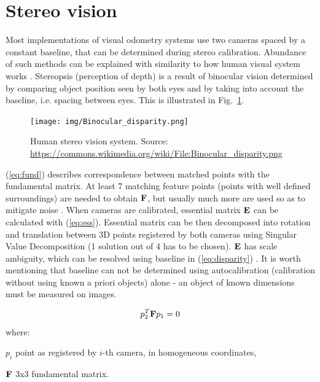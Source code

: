 
\section{Stereo vision}
\label{sec:stereo}

Most implementations of visual odometry systems use two cameras spaced by a constant baseline, that can be determined during stereo calibration. Abundance of such methods can be explained with similarity to how human visual system works \cite{cyganek}. Stereopsis (perception of depth) is a result of binocular vision determined by comparing object position seen by both eyes and by taking into account the baseline, i.e. spacing between eyes. This is illustrated in Fig.~\ref{fig:stereo}.

\begin{figure}[ht]
	\centering\texttt{[image: img/Binocular\_disparity.png]}
	\caption{Human stereo vision system. Source: \url{https://commons.wikimedia.org/wiki/File:Binocular_disparity.png}}
	\label{fig:stereo}
\end{figure}

(\ref{eq:fund}) describes correspondence between matched points with the fundamental matrix. At least 7 matching feature points (points with well defined surroundings) are needed to obtain $\textbf{F}$, but usually much more are used so as to mitigate noise \cite{zhang1998determining}. When cameras are calibrated, essential matrix $\textbf{E}$ can be calculated with (\ref{eq:ess}). Essential matrix can be then decomposed into rotation and translation between 3D points registered by both cameras using Singular Value Decomposition (1 solution out of 4 has to be chosen). $\textbf{E}$ has scale ambiguity, which can be resolved using baseline in (\ref{eq:disparity}) \cite{improving}. It is worth mentioning that baseline can not be determined using autocalibration (calibration without using known a priori objects) alone - an object of known dimensions must be measured on images.

\begin{equation}
p_{2}^{T}\textbf{F}p_{1}=0
\label{eq:fund}
\end{equation}
where:
\begin{eqwhere}[2cm]
	\item[$p_{i}$] point as registered by $i$-th camera, in homogeneous coordinates,
	\item[$\textbf{F}$] 3x3 fundamental matrix.
\end{eqwhere}

